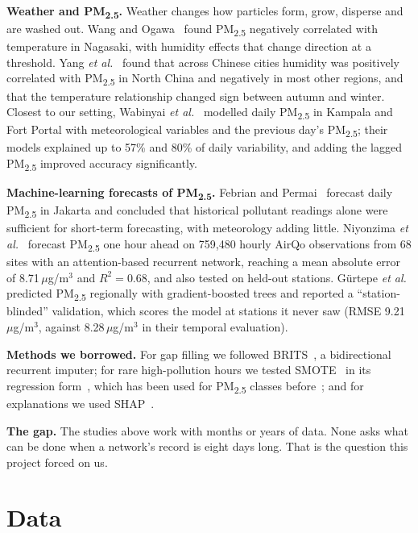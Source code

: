 \documentclass{ieeeaccess}
\newcommand{\ugm}{\,$\mu$g/m$^{3}$}
\newcommand{\pmtwo}{PM\textsubscript{2.5}}
\begin{document}
\textbf{Weather and \pmtwo{}.} Weather changes how particles form, grow, disperse and are washed out. Wang and Ogawa~\cite{wangogawa2015} found \pmtwo{} negatively correlated with temperature in Nagasaki, with humidity effects that change direction at a threshold. Yang \emph{et al.}~\cite{yang2017} found that across Chinese cities humidity was positively correlated with \pmtwo{} in North China and negatively in most other regions, and that the temperature relationship changed sign between autumn and winter. Closest to our setting, Wabinyai \emph{et al.}~\cite{wabinyai2026} modelled daily \pmtwo{} in Kampala and Fort Portal with meteorological variables and the previous day's \pmtwo{}; their models explained up to 57\% and 80\% of daily variability, and adding the lagged \pmtwo{} improved accuracy significantly.

\textbf{Machine-learning forecasts of \pmtwo{}.} Febrian and Permai~\cite{febrian2025} forecast daily \pmtwo{} in Jakarta and concluded that historical pollutant readings alone were sufficient for short-term forecasting, with meteorology adding little. Niyonzima \emph{et al.}~\cite{niyonzima2026} forecast \pmtwo{} one hour ahead on 759{,}480 hourly AirQo observations from 68 sites with an attention-based recurrent network, reaching a mean absolute error of 8.71\ugm{} and $R^2 = 0.68$, and also tested on held-out stations. G\"urtepe \emph{et al.}~\cite{gurtepe2025} predicted \pmtwo{} regionally with gradient-boosted trees and reported a ``station-blinded'' validation, which scores the model at stations it never saw (RMSE 9.21\ugm{}, against 8.28\ugm{} in their temporal evaluation).

\textbf{Methods we borrowed.} For gap filling we followed BRITS~\cite{cao2018}, a bidirectional recurrent imputer; for rare high-pollution hours we tested SMOTE~\cite{chawla2002} in its regression form~\cite{torgo2013}, which has been used for \pmtwo{} classes before~\cite{saminathan2023}; and for explanations we used SHAP~\cite{lundberg2017,lundberg2020}.

\textbf{The gap.} The studies above work with months or years of data. None asks what can be done when a network's record is eight days long. That is the question this project forced on us.

\section{Data}
\label{sec:data}
\end{document}
